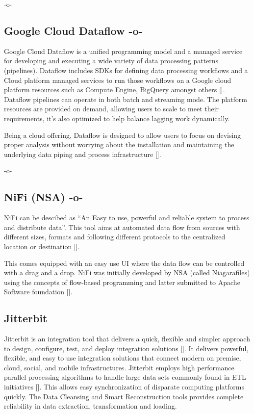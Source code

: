     -o-

\subsection{Google Cloud Dataflow -o-}
    
Google Cloud Dataflow is a unified programming model and a managed
service for developing and executing a wide variety of data processing
patterns (pipelines). Dataflow includes SDKs for defining data
processing workflows and a Cloud platform managed services to run
those workflows on a Google cloud platform resources such as Compute
Engine, BigQuery amongst others [\cite{www-Dataflow}]. Dataflow
pipelines can operate in both batch and streaming mode. The platform
resources are provided on demand, allowing users to scale to meet
their requirements, it's also optimized to help balance lagging work
dynamically.

Being a cloud offering, Dataflow is designed to allow users to focus
on devising proper analysis without worrying about the installation
and maintaining the underlying data piping and process
infrastructure [\cite{www-GoogleLiveStream}].

    -o-
    
\subsection{NiFi (NSA) -o-}

NiFi can be descibed as ``An Easy to use, powerful and reliable system
to process and distribute data''\cite{www-nifi}.  This tool aims at
automated data flow from sources with different sizes, formats and
following different protocols to the centralized location or
destination [\cite{www-hortanworks}].
    
This comes equipped with an easy use UI where the data flow can be
controlled with a drag and a drop.  NiFi was initially developed by
NSA (called Niagarafiles) using the concepts of flow-based programming
and latter submitted to Apache Software foundation [\cite{www-forbes}].

\subsection{Jitterbit}

Jitterbit is an integration tool that delivers a quick, flexible and
simpler approach to design, configure, test, and deploy integration
solutions [\cite{datasheet}].  It delivers powerful, flexible, and easy
to use integration solutions that connect modern on premise, cloud,
social, and mobile infrastructures. Jitterbit employs high performance
parallel processing algorithms to handle large data sets commonly
found in ETL initiatives [\cite{www-jitetl}]. This allows easy
synchronization of disparate computing platforms quickly. The Data
Cleansing and Smart Reconstruction tools provides complete reliability
in data extraction, transformation and loading.


